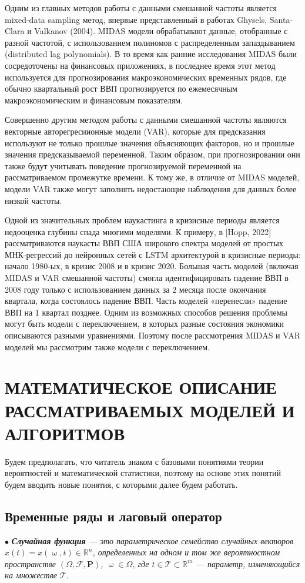 \documentclass[a4paper, 14pt]{extarticle}
\newcommand{\Rm}{\mathbb{R}}
\renewcommand{\omega}{\upomega}
\begin{document}
	Одним из главных методов работы с данными смешанной частоты является mixed-data sampling метод, впервые представленный в работах Ghysels, Santa-Clara и Valkanov (2004). MIDAS модели
	обрабатывают данные, отобранные с разной частотой, с
	использованием полиномов с распределенным запаздыванием (distributed lag polynomials). В то время как ранние исследования MIDAS были сосредоточены на финансовых
	приложениях, в последнее время этот метод
	используется для прогнозирования макроэкономических временных рядов, где обычно квартальный
	рост ВВП прогнозируется по ежемесячным макроэкономическим и финансовым показателям.
	
	Совершенно другим методом работы с данными смешанной частоты являются векторные авторегресиионные модели (VAR), которые для предсказания используют не только прошлые значения объясняющих факторов, но и прошлые значения предсказываемой переменной. Таким образом, при прогнозировании они также будут учитывать поведение прогнозируемой переменной на рассматриваемом промежутке времени. К тому же, в отличие от MIDAS моделей, модели VAR также могут заполнять недостающие наблюдения для данных более низкой частоты.
	
	Одной из значительных проблем наукастинга в кризисные периоды является недооценка глубины спада многими моделями. К примеру, в [Hopp, 2022] рассматриваются наукасты ВВП США широкого спектра моделей от простых МНК-регрессий до нейронных сетей с LSTM архитектурой в кризисные периоды: начало 1980-ых, в кризис 2008 и в кризис 2020. Большая часть моделей (включая MIDAS и VAR смешанной частоты) смогла идентифицировать падение ВВП в 2008 году только с использованием данных за 2 месяца после окончания квартала, когда состоялось падение ВВП. Часть моделей «перенесли» падение ВВП на 1 квартал позднее. Одним из возможных способов решения проблемы могут быть модели с переключением, в которых разные состояния экономики описываются разными уравнениями. Поэтому после рассмотрения MIDAS и VAR моделей мы рассмотрим также модели с переключением. 
	\newpage
	\section{МАТЕМАТИЧЕСКОЕ ОПИСАНИЕ РАССМАТРИВАЕМЫХ МОДЕЛЕЙ И АЛГОРИТМОВ}
	Будем предполагать, что читатель знаком с базовыми понятиями теории вероятностей и математической статистики, поэтому на основе этих понятий будем вводить новые понятия, с которыми далее будем работать.
	\subsection{Временные ряды и лаговый оператор}
	$\bullet$ \textit{\textbf{Случайная функция} --- это параметрическое семейство случайных векторов $x(t) = x(\omega, t)\in \Rm^n$, определенных на одном и том же вероятностном пространстве $(\Omega, \mathcal{F}, \mathbf{P})$, $\omega \in \Omega$, где $t \in \mathcal{T} \subset \Rm^m$ --- параметр, изменяющийся на множестве $\mathcal{T}$.}
	
\end{document}
